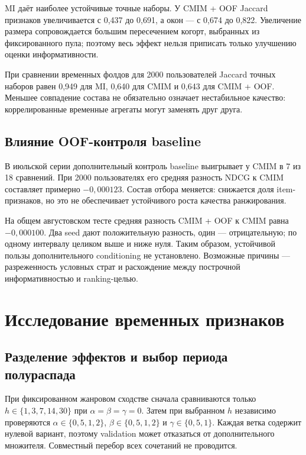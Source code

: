 \documentclass[12pt,a4paper]{article}
\begin{document}
MI даёт наиболее устойчивые точные наборы. У CMIM + OOF Jaccard
признаков увеличивается с 0,437 до 0,691, а окон — с 0,674 до 0,822.
Увеличение размера сопровождается большим пересечением когорт,
выбранных из фиксированного пула; поэтому весь эффект нельзя приписать
только улучшению оценки информативности.

При сравнении временных фолдов для 2000 пользователей Jaccard точных
наборов равен 0,949 для MI, 0,640 для CMIM и 0,643 для CMIM + OOF.
Меньшее совпадение состава не обязательно означает нестабильное качество:
коррелированные временные агрегаты могут заменять друг друга.

\subsection{Влияние OOF-контроля baseline}
В июльской серии дополнительный контроль baseline выигрывает у CMIM
в 7 из 18 сравнений. При 2000 пользователях его средняя разность NDCG
к CMIM составляет примерно $-0,000123$. Состав отбора меняется:
снижается доля item-признаков, но это не обеспечивает устойчивого роста
качества ранжирования.

На общем августовском тесте средняя разность CMIM + OOF к CMIM равна
$-0,000100$. Два seed дают положительную разность, один — отрицательную;
по одному интервалу целиком выше и ниже нуля. Таким образом, устойчивой
пользы дополнительного conditioning не установлено. Возможные причины —
разреженность условных страт и расхождение между построчной
информативностью и ranking-целью.

\section{Исследование временных признаков}
\subsection{Разделение эффектов и выбор периода полураспада}
При фиксированном жанровом сходстве сначала сравниваются только
$h\in\{1,3,7,14,30\}$ при $\alpha=\beta=\gamma=0$.
Затем при выбранном $h$ независимо проверяются $\alpha\in\{0{,}5,1,2\}$,
$\beta\in\{0{,}5,1,2\}$ и $\gamma\in\{0{,}5,1\}$.
Каждая ветка содержит нулевой вариант, поэтому validation может
отказаться от дополнительного множителя. Совместный перебор всех
сочетаний не проводится.
\end{document}
